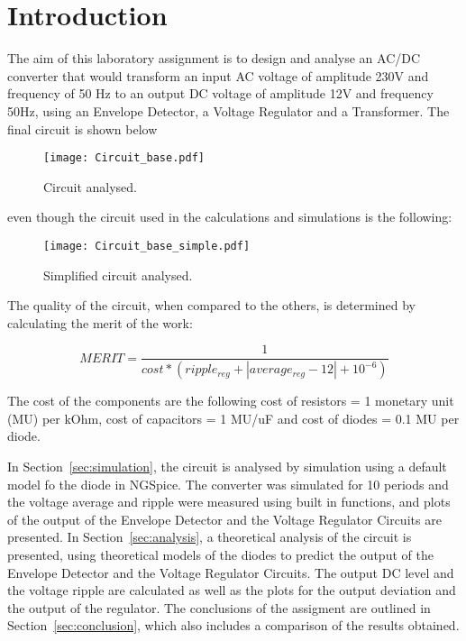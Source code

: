 \section{Introduction}
\label{sec:introduction}

The aim of this laboratory assignment is to design and analyse an AC/DC converter that would transform an input AC voltage of amplitude 230V and frequency of 50 Hz to an output DC voltage of amplitude 12V and frequency 50Hz, using an Envelope Detector, a Voltage Regulator and a Transformer. The final circuit is shown below

\begin{figure}[h] \centering
\texttt{[image: Circuit\_base.pdf]}
\caption{Circuit analysed.}
\label{fig:Circuit_Base}
\end{figure}

even though the circuit used in the calculations and simulations is the following:

\begin{figure}[h] \centering
\texttt{[image: Circuit\_base\_simple.pdf]}
\caption{Simplified circuit analysed.}
\label{fig:Circuit_Base_S}
\end{figure}
 

The quality of the circuit, when compared to the others, is determined by calculating the merit of the work: 

\begin {equation}
MERIT =\frac{1}{cost*(ripple_{reg}+|average_{reg}-12|+10^{-6})}
\label{eq:i1}
\end{equation}

The cost of the components are the following cost of resistors = 1 monetary unit (MU) per kOhm, cost of capacitors = 1 MU/uF and cost of diodes = 0.1 MU per diode.

In Section~\ref{sec:simulation}, the circuit is analysed by simulation using a default model fo the diode in NGSpice. The converter was simulated for 10 periods and the voltage average and ripple were measured using built in functions, and plots of the output of the Envelope Detector and the Voltage Regulator Circuits are presented.
In Section~\ref{sec:analysis}, a theoretical analysis of the circuit is presented, using theoretical models of the diodes to predict the output of the Envelope Detector and the Voltage Regulator Circuits. The output DC level and the voltage ripple are calculated as well as the plots for the output deviation and the output of the regulator.
The conclusions of the assigment are outlined in  Section~\ref{sec:conclusion}, which also includes a comparison of the results obtained.